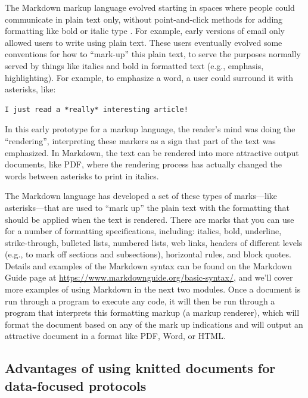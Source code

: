 \documentclass[]{tufte-book}
\begin{document}
The Markdown markup language evolved starting in spaces where people could
communicate in plain text only, without point-and-click methods for adding
formatting like bold or italic type \citep{buffalo2015bioinformatics}. For example,
early versions of email only allowed users to write using plain text. These
users eventually evolved some conventions for how to ``mark-up'' this plain text,
to serve the purposes normally served by things like italics and bold in formatted text
(e.g., emphasis, highlighting). For example, to emphasize a word, a user could
surround it with asterisks, like:

\begin{verbatim}
I just read a *really* interesting article!
\end{verbatim}

In this early prototype for a markup language, the reader's mind was doing
the ``rendering'', interpreting these markers as a sign that part of the text
was emphasized. In Markdown, the text can be rendered into more attractive
output documents, like PDF, where the rendering process has actually
changed the words between asterisks to print in italics.

The Markdown language has developed a set of these types of marks---like
asterisks---that are used to ``mark up'' the plain text with the formatting that
should be applied when the text is rendered. There are marks that you can use
for a number of formatting specifications, including: italics, bold, underline,
strike-through, bulleted lists, numbered lists, web links, headers of different
levels (e.g., to mark off sections and subsections), horizontal
rules, and block quotes. Details and examples of the Markdown syntax can be
found on the Markdown Guide page at \url{https://www.markdownguide.org/basic-syntax/},
and we'll cover more examples of using Markdown in the next two modules. Once a
document is run through a program to execute any code, it will then be run
through a program that interprets this formatting markup (a markup renderer),
which will format the document based on any of the mark up indications and will
output an attractive document in a format like PDF, Word, or HTML.

\subsection{Advantages of using knitted documents for data-focused protocols}\label{advantages-of-using-knitted-documents-for-data-focused-protocols}
\end{document}
